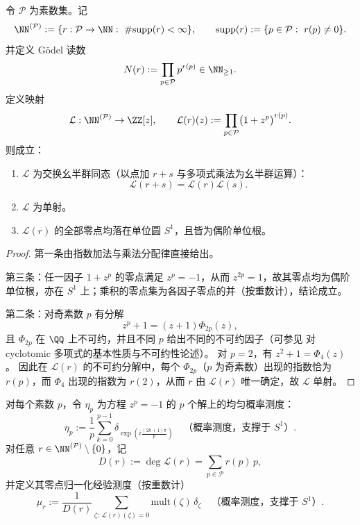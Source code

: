 \begin{theorem}\label{thm:xi-leyang-godel-prime-register-algebraic-identifiability}
令 \(\mathcal P\) 为素数集。记
\[
\NN^{(\mathcal P)}:=\{r:\mathcal P\to\NN:\ \#\mathrm{supp}(r)<\infty\},
\qquad
\mathrm{supp}(r):=\{p\in\mathcal P:\ r(p)\neq 0\}.
\]
并定义 Gödel 读数
\[
N(r):=\prod_{p\in\mathcal P}p^{r(p)}\in\NN_{\ge 1}.
\]
定义映射
\[
\mathcal L:\NN^{(\mathcal P)}\to \ZZ[z],
\qquad
\mathcal L(r)(z):=\prod_{p\in\mathcal P}\bigl(1+z^p\bigr)^{r(p)}.
\]
则成立：
\begin{enumerate}
  \item \(\mathcal L\) 为交换幺半群同态（以点加 \(r+s\) 与多项式乘法为幺半群运算）：
  \[
  \mathcal L(r+s)=\mathcal L(r)\mathcal L(s).
  \]
  \item \(\mathcal L\) 为单射。
  \item \(\mathcal L(r)\) 的全部零点均落在单位圆 \(S^1\)，且皆为偶阶单位根。
\end{enumerate}
\end{theorem}
\begin{proof}
第一条由指数加法与乘法分配律直接给出。
\par
第三条：任一因子 \(1+z^p\) 的零点满足 \(z^p=-1\)，从而 \(z^{2p}=1\)，故其零点均为偶阶单位根，亦在 \(S^1\) 上；乘积的零点集为各因子零点的并（按重数计），结论成立。
\par
第二条：对奇素数 \(p\) 有分解
\[
z^p+1=(z+1)\Phi_{2p}(z),
\]
且 \(\Phi_{2p}\) 在 \(\QQ\) 上不可约，并且不同 \(p\) 给出不同的不可约因子（可参见 \cite{Serre1973CourseArithmetic} 对 cyclotomic 多项式的基本性质与不可约性论述）。
对 \(p=2\)，有 \(z^2+1=\Phi_4(z)\)。
因此在 \(\mathcal L(r)\) 的不可约分解中，每个 \(\Phi_{2p}\)（\(p\) 为奇素数）出现的指数恰为 \(r(p)\)，而 \(\Phi_4\) 出现的指数为 \(r(2)\)，从而 \(r\) 由 \(\mathcal L(r)\) 唯一确定，故 \(\mathcal L\) 单射。
\end{proof}

\begin{definition}[素数根均匀测度与零点经验测度]\label{def:xi-leyang-prime-root-measures}
对每个素数 \(p\)，令 \(\eta_p\) 为方程 \(z^p=-1\) 的 \(p\) 个解上的均匀概率测度：
\[
\eta_p:=\frac1p\sum_{k=0}^{p-1}\delta_{\exp\!\left(i\frac{(2k+1)\pi}{p}\right)}
\quad\text{（概率测度，支撑于 \(S^1\)）}.
\]
对任意 \(r\in\NN^{(\mathcal P)}\setminus\{0\}\)，记
\[
D(r):=\deg \mathcal L(r)=\sum_{p\in\mathcal P}r(p)\,p,
\]
并定义其零点归一化经验测度（按重数计）
\[
\mu_r:=\frac1{D(r)}\sum_{\zeta:\ \mathcal L(r)(\zeta)=0}\mathrm{mult}(\zeta)\,\delta_\zeta
\quad\text{（概率测度，支撑于 \(S^1\)）}.
\]
\end{definition}

